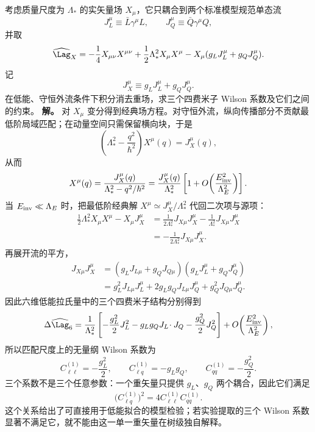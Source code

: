 \begin{exbox}[重单态矢量场的树级匹配]
考虑质量尺度为 $\Lambda_*$ 的实矢量场 $X_\mu$，它只耦合到两个标准模型规范单态流
\begin{equation*}
J_L^\mu\equiv\bar L\gamma^\mu L,
\qquad
J_Q^\mu\equiv\bar Q\gamma^\mu Q,
\end{equation*}
并取
\begin{equation}
\widehat\Lag_X
=-\frac14X_{\mu\nu}X^{\mu\nu}
+\frac12\Lambda_*^2X_\mu X^\mu
-X_\mu(g_LJ_L^\mu+g_QJ_Q^\mu).
\label{eq:heavy-vector-uv-lag-dp13}
\end{equation}
记
\begin{equation*}
J_X^\mu\equiv g_LJ_L^\mu+g_QJ_Q^\mu.
\end{equation*}
在低能、守恒外流条件下积分消去重场，求三个四费米子 Wilson 系数及它们之间的约束。
\textbf{解。} 对 $X_\mu$ 变分得到经典场方程。对守恒外流，纵向传播部分不贡献最低阶局域匹配；在动量空间只需保留横向块，于是
\begin{equation*}
\left(\Lambda_*^2-\frac{q^2}{\hbar^2}\right)X^\mu(q)=J_X^\mu(q),
\end{equation*}
从而
\begin{equation*}
X^\mu(q)
=\frac{J_X^\mu(q)}{\Lambda_*^2-q^2/\hbar^2}
=\frac{J_X^\mu(q)}{\Lambda_*^2}
\left[1+O\!\left(\frac{E_{\rm inv}^2}{\Lambda_E^2}\right)\right].
\end{equation*}
当 $E_{\rm inv}\ll\Lambda_E$ 时，把最低阶经典解 $X^\mu\simeq J_X^\mu/\Lambda_*^2$ 代回二次项与源项：
\begin{align*}
\frac12\Lambda_*^2X_\mu X^\mu-X_\mu J_X^\mu
&=\frac{1}{2\Lambda_*^2}J_{X\mu}J_X^\mu
-\frac{1}{\Lambda_*^2}J_{X\mu}J_X^\mu\\
&=-\frac{1}{2\Lambda_*^2}J_{X\mu}J_X^\mu.
\end{align*}
再展开流的平方，
\begin{align*}
J_{X\mu}J_X^\mu
&=(g_LJ_{L\mu}+g_QJ_{Q\mu})
  (g_LJ_L^\mu+g_QJ_Q^\mu)\\
&=g_L^2J_{L\mu}J_L^\mu
 +2g_Lg_QJ_{L\mu}J_Q^\mu
 +g_Q^2J_{Q\mu}J_Q^\mu.
\end{align*}
因此六维低能拉氏量中的三个四费米子结构分别得到
\begin{equation*}
\Delta\widehat\Lag_6
=\frac1{\Lambda_*^2}
\left[
-\frac{g_L^2}{2}J_L^2
-g_Lg_QJ_L\!\cdot J_Q
-\frac{g_Q^2}{2}J_Q^2
\right]
+O\!\left(\frac{E_{\rm inv}^2}{\Lambda_E^2}\right),
\end{equation*}
所以匹配尺度上的无量纲 Wilson 系数为
\begin{equation}
{
C_{\ell\ell}^{(1)}=-\frac{g_L^2}{2},
\qquad
C_{\ell q}^{(1)}=-g_Lg_Q,
\qquad
C_{qq}^{(1)}=-\frac{g_Q^2}{2}.}
\label{eq:heavy-vector-wilson-matching-dp13}
\end{equation}
三个系数不是三个任意参数：一个重矢量只提供 $g_L$、$g_Q$ 两个耦合，因此它们满足
\begin{equation*}
\bigl(C_{\ell q}^{(1)}\bigr)^2
=4C_{\ell\ell}^{(1)}C_{qq}^{(1)}.
\end{equation*}
这个关系给出了可直接用于低能拟合的模型检验；若实验提取的三个 Wilson 系数显著不满足它，就不能由这一单一重矢量在树级独自解释。
\end{exbox}

